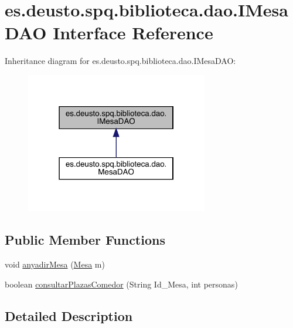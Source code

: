 \hypertarget{interfacees_1_1deusto_1_1spq_1_1biblioteca_1_1dao_1_1_i_mesa_d_a_o}{}\section{es.\+deusto.\+spq.\+biblioteca.\+dao.\+I\+Mesa\+D\+AO Interface Reference}
\label{interfacees_1_1deusto_1_1spq_1_1biblioteca_1_1dao_1_1_i_mesa_d_a_o}


Inheritance diagram for es.\+deusto.\+spq.\+biblioteca.\+dao.\+I\+Mesa\+D\+AO\+:
\nopagebreak
\begin{figure}[H]
\begin{center}
\leavevmode
\includegraphics[width=226pt]{interfacees_1_1deusto_1_1spq_1_1biblioteca_1_1dao_1_1_i_mesa_d_a_o__inherit__graph}
\end{center}
\end{figure}
\subsection*{Public Member Functions}
\begin{DoxyCompactItemize}
\item 
void \mbox{\hyperlink{interfacees_1_1deusto_1_1spq_1_1biblioteca_1_1dao_1_1_i_mesa_d_a_o_ac50be7c69b793e067aceb17f3b01594a}{anyadir\+Mesa}} (\mbox{\hyperlink{classes_1_1deusto_1_1spq_1_1biblioteca_1_1data_1_1_mesa}{Mesa}} m)
\item 
boolean \mbox{\hyperlink{interfacees_1_1deusto_1_1spq_1_1biblioteca_1_1dao_1_1_i_mesa_d_a_o_a82ff152d68c25134fdffa41a1b08a347}{consultar\+Plazas\+Comedor}} (String Id\+\_\+\+Mesa, int personas)
\end{DoxyCompactItemize}


\subsection{Detailed Description}


